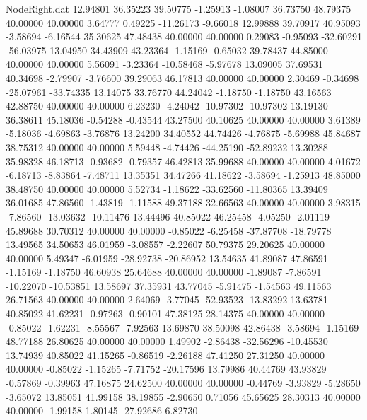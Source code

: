\begin{filecontents}{NodeRight.dat}
  12.94801   36.35223   39.50775    -1.25913   -1.08007   36.73750   48.79375   40.00000   40.00000    3.64777    0.49225  -11.26173   -9.66018
  12.99888   39.70917   40.95093    -3.58694   -6.16544   35.30625   47.48438   40.00000   40.00000    0.29083   -0.95093  -32.60291  -56.03975
  13.04950   34.43909   43.23364    -1.15169   -0.65032   39.78437   44.85000   40.00000   40.00000    5.56091   -3.23364  -10.58468   -5.97678
  13.09005   37.69531   40.34698    -2.79907   -3.76600   39.29063   46.17813   40.00000   40.00000    2.30469   -0.34698  -25.07961  -33.74335
  13.14075   33.76770   44.24042    -1.18750   -1.18750   43.16563   42.88750   40.00000   40.00000    6.23230   -4.24042  -10.97302  -10.97302
  13.19130   36.38611   45.18036    -0.54288   -0.43544   43.27500   40.10625   40.00000   40.00000    3.61389   -5.18036   -4.69863   -3.76876
  13.24200   34.40552   44.74426    -4.76875   -5.69988   45.84687   38.75312   40.00000   40.00000    5.59448   -4.74426  -44.25190  -52.89232
  13.30288   35.98328   46.18713    -0.93682   -0.79357   46.42813   35.99688   40.00000   40.00000    4.01672   -6.18713   -8.83864   -7.48711
  13.35351   34.47266   41.18622    -3.58694   -1.25913   48.85000   38.48750   40.00000   40.00000    5.52734   -1.18622  -33.62560  -11.80365
  13.39409   36.01685   47.86560    -1.43819   -1.11588   49.37188   32.66563   40.00000   40.00000    3.98315   -7.86560  -13.03632  -10.11476
  13.44496   40.85022   46.25458    -4.05250   -2.01119   45.89688   30.70312   40.00000   40.00000   -0.85022   -6.25458  -37.87708  -18.79778
  13.49565   34.50653   46.01959    -3.08557   -2.22607   50.79375   29.20625   40.00000   40.00000    5.49347   -6.01959  -28.92738  -20.86952
  13.54635   41.89087   47.86591    -1.15169   -1.18750   46.60938   25.64688   40.00000   40.00000   -1.89087   -7.86591  -10.22070  -10.53851
  13.58697   37.35931   43.77045    -5.91475   -1.54563   49.11563   26.71563   40.00000   40.00000    2.64069   -3.77045  -52.93523  -13.83292
  13.63781   40.85022   41.62231    -0.97263   -0.90101   47.38125   28.14375   40.00000   40.00000   -0.85022   -1.62231   -8.55567   -7.92563
  13.69870   38.50098   42.86438    -3.58694   -1.15169   48.77188   26.80625   40.00000   40.00000    1.49902   -2.86438  -32.56296  -10.45530
  13.74939   40.85022   41.15265    -0.86519   -2.26188   47.41250   27.31250   40.00000   40.00000   -0.85022   -1.15265   -7.71752  -20.17596
  13.79986   40.44769   43.93829    -0.57869   -0.39963   47.16875   24.62500   40.00000   40.00000   -0.44769   -3.93829   -5.28650   -3.65072
  13.85051   41.99158   38.19855    -2.90650    0.71056   45.65625   28.30313   40.00000   40.00000   -1.99158    1.80145  -27.92686    6.82730

\end{filecontents}
